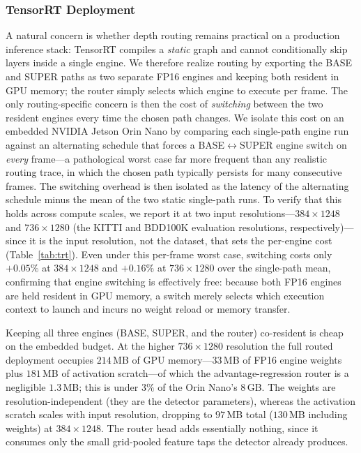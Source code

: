 \subsubsection{TensorRT Deployment}
\label{sec:results_trt}
A natural concern is whether depth routing remains practical on a production inference stack: TensorRT compiles a \emph{static} graph and cannot conditionally skip layers inside a single engine.
We therefore realize routing by exporting the BASE and SUPER paths as two separate FP16 engines and keeping both resident in GPU memory; the router simply selects which engine to execute per frame.
The only routing-specific concern is then the cost of \emph{switching} between the two resident engines every time the chosen path changes.
We isolate this cost on an embedded NVIDIA Jetson Orin Nano by comparing each single-path engine run against an alternating schedule that forces a BASE$\leftrightarrow$SUPER engine switch on \emph{every} frame---a pathological worst case far more frequent than any realistic routing trace, in which the chosen path typically persists for many consecutive frames.
The switching overhead is then isolated as the latency of the alternating schedule minus the mean of the two static single-path runs.
To verify that this holds across compute scales, we report it at two input resolutions---$384\times1248$ and $736\times1280$ (the KITTI and BDD100K evaluation resolutions, respectively)---since it is the input resolution, not the dataset, that sets the per-engine cost (Table~\ref{tab:trt}).
Even under this per-frame worst case, switching costs only $+0.05\%$ at $384\times1248$ and $+0.16\%$ at $736\times1280$ over the single-path mean, confirming that engine switching is effectively free: because both FP16 engines are held resident in GPU memory, a switch merely selects which execution context to launch and incurs no weight reload or memory transfer.

Keeping all three engines (BASE, SUPER, and the router) co-resident is cheap on the embedded budget.
At the higher $736\times1280$ resolution the full routed deployment occupies $214$\,MB of GPU memory---$33$\,MB of FP16 engine weights plus $181$\,MB of activation scratch---of which the advantage-regression router is a negligible $1.3$\,MB; this is under $3\%$ of the Orin Nano's $8$\,GB.
The weights are resolution-independent (they are the detector parameters), whereas the activation scratch scales with input resolution, dropping to $97$\,MB total ($130$\,MB including weights) at $384\times1248$.
The router head adds essentially nothing, since it consumes only the small grid-pooled feature taps the detector already produces.

